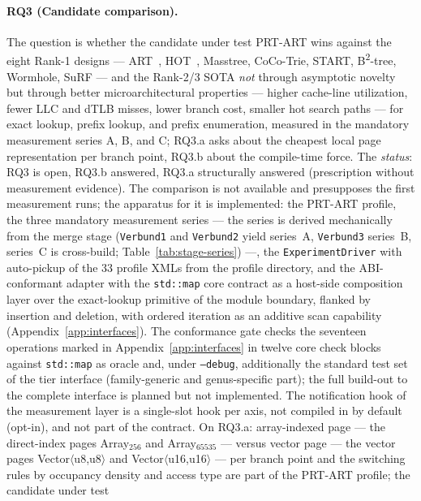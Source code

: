 \begin{nurlang}
\paragraph{RQ3 (Candidate comparison).} The question is whether the candidate under test PRT-ART wins against the
eight Rank-1 designs --- ART~\cite{leis2013art}, HOT~\cite{binna2018hot}, Masstree, CoCo-Trie,
START, B\textsuperscript{2}-tree, Wormhole, SuRF --- and the Rank-2/3 SOTA \emph{not} through
asymptotic novelty but through better microarchitectural properties --- higher cache-line
utilization, fewer LLC and dTLB misses, lower branch cost, smaller hot search paths --- for exact
lookup, prefix lookup, and prefix enumeration, measured in the mandatory measurement series A, B,
and C\@; RQ3.a asks about the cheapest local page representation per branch point, RQ3.b about
the compile-time force. The \emph{status}: RQ3 is open, RQ3.b answered, RQ3.a structurally
answered (prescription without measurement evidence). The comparison is not available and
presupposes the first measurement runs; the apparatus for it is implemented: the PRT-ART profile,
the three mandatory measurement series --- the series is derived mechanically from the merge stage
(\texttt{Verbund1} and \texttt{Verbund2} yield series~A, \texttt{Verbund3} series~B, series~C is
cross-build; Table~\ref{tab:stage-series}) ---, the \texttt{ExperimentDriver} with auto-pickup of
the 33 profile XMLs from the profile directory, and the ABI-conformant adapter with the
\texttt{std::map} core contract as a host-side composition layer over the exact-lookup primitive
of the module boundary, flanked by insertion and deletion, with ordered iteration as an additive
scan capability (Appendix~\ref{app:interfaces}). The conformance gate checks the seventeen
operations marked in Appendix~\ref{app:interfaces} in twelve core check blocks against
\texttt{std::map} as oracle and, under \texttt{--debug}, additionally the standard test set of the tier
interface (family-generic and genus-specific part); the full build-out to the complete interface is
planned but not
implemented. The notification hook of the measurement layer is a single-slot hook per axis, not
compiled in by default (opt-in), and not part of the contract. On RQ3.a: array-indexed page --- the
direct-index pages Array$_{256}$ and Array$_{65535}$ --- versus vector page --- the vector pages
Vector$\langle$u8,u8$\rangle$ and Vector$\langle$u16,u16$\rangle$ --- per branch point and the
switching rules by occupancy density and access type are part of the PRT-ART profile; the candidate under test

\end{nurlang}
